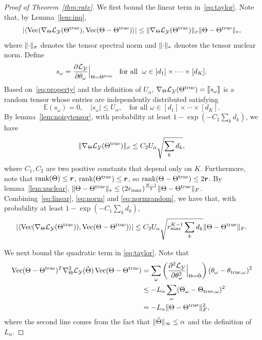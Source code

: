 \documentclass[11pt]{article}
\theoremstyle{plain}
\theoremstyle{definition}
\begin{document}
\begin{proof}[Proof of Theorem~\ref{thm:rate}]
We first bound the linear term in~\eqref{eq:taylor}. Note that, by Lemma~\ref{lem:inq},
\begin{equation}\label{eq:linear}
|\langle\operatorname{Vec}(\nabla_{\Theta}\mathcal{L}_{\mathcal{Y}}(\Theta^{\mathrm{true}}), \operatorname{Vec}(\Theta-\Theta^{\mathrm{true}})  \rangle|\leq \lVert\nabla_{\Theta}\mathcal{L}_{\mathcal{Y}}(\Theta^{\mathrm{true}})\rVert_\sigma \lVert\Theta-\Theta^{\mathrm{true}}\rVert_*,
\end{equation}
where $\lVert\cdot\rVert_\sigma$ denotes the tensor spectral norm and $\lVert\cdot\rVert_*$ denotes the tensor nuclear norm. Define
\[
s_\omega={\partial \mathcal{L}_{\mathcal{Y}}\over \partial \theta_\omega}\Big|_{\Theta=\Theta^{\mathrm{true}}} \;\; \textrm{ for all } \; \omega\in[d_1]\times\cdots\times [d_K].
\]
Based on~\eqref{eq:property} and the definition of $U_\alpha$, $\nabla_{\Theta}\mathcal{L}_{\mathcal{Y}}(\Theta^{\mathrm{true}})=\llbracket s_{\omega} \rrbracket$ is a random tensor whose entries are independently distributed satisfying
\begin{equation}\label{eq:norm}
\mathbb{E}(s_\omega)=0,\quad |s_\omega|\leq U_\alpha, \quad \text{for all }\omega\in[d_1]\times \cdots \times [d_K].
\end{equation}
By lemma~\ref{lem:noisytensor}, with probability at least $1-\exp(-C_1 \sum_kd_k)$, we have
\begin{equation}\label{eq:normrandom}
\lVert\nabla_{\Theta}\mathcal{L}_{\mathcal{Y}}(\Theta^{\mathrm{true}})\rVert_\sigma \leq C_2 U_\alpha\sqrt{\sum_k d_k},
\end{equation}
where $C_1, C_2$ are two positive constants that depend only on $K$. Furthermore, note that $\text{rank}(\Theta)\leq \bm{r}$, $\text{rank}(\Theta^{\mathrm{true}})\leq \bm{r}$, so $\text{rank}(\Theta-\Theta^{\mathrm{true}})\leq 2\bm{r}$. By lemma~\ref{lem:nuclear}, $\lVert\Theta-\Theta^{\mathrm{true}}\rVert_*\leq (2r_{\max})^{K-1\over 2}\lVert\Theta-\Theta^{\mathrm{true}}\rVert_F$. Combining~\eqref{eq:linear}, \eqref{eq:norm} and \eqref{eq:normrandom}, we have that, with probability at least $1-\exp(-C_1 \sum_kd_k)$,
\begin{equation}\label{eq:linearconclusion}
|\langle \operatorname{Vec}(\nabla_{\Theta}\mathcal{L}_{\mathcal{Y}}(\Theta^{\mathrm{true}})), \operatorname{Vec}(\Theta-\Theta^{\mathrm{true}})  \rangle | \leq C_2 U_\alpha  \sqrt{r_{\max}^{K-1} \sum_k d_k}  \lVert\Theta-\Theta^{\mathrm{true}}\rVert_F.
\end{equation}

We next bound the quadratic term in \eqref{eq:taylor}. Note that
\begin{align}\label{eq:quadratic}
 \operatorname{Vec}(\Theta-\Theta^{\mathrm{true}})^T \nabla^2_{\Theta}\mathcal{L}_{\mathcal{Y}}(\check{\Theta})\operatorname{Vec}(\Theta-\Theta^{\mathrm{true}})&=\sum_\omega \left( {\partial^2\mathcal{L}_{\mathcal{Y}}\over \partial \theta^2_\omega} \Big|_{\Theta=\check\Theta} \right)(\theta_\omega-\theta_{{\text{true}},\omega})^2 \nonumber \\
&\leq - L_\alpha\sum_{\omega}(\Theta_{\omega}-\Theta_{\text{true},\omega})^2 \nonumber \\
&=-L_\alpha\lVert\Theta-\Theta^{\mathrm{true}}\rVert_F^2,
\end{align}
where the second line comes from the fact that  $\lVert\check\Theta\rVert_\infty\leq \alpha$ and the definition of $L_\alpha$.


\end{proof}
\end{document}
